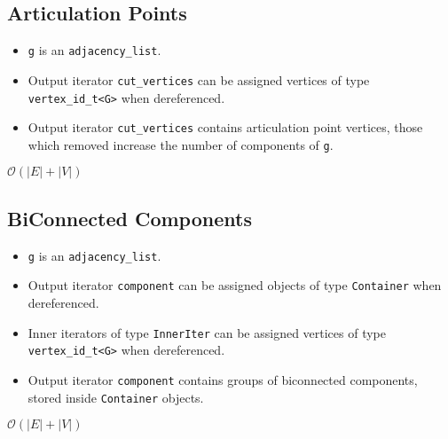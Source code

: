 \subsection{Articulation Points}
{\small
     
}
\begin{itemdescr}
      \pnum\preconditions
      \begin{itemize}
            \item
              \lstinline{g} is an \lstinline{adjacency_list}.
            \item
              Output iterator \lstinline{cut_vertices} can be assigned vertices of type \lstinline{vertex_id_t<G>} when dereferenced.
      \end{itemize}
      \pnum\effects
      \begin{itemize}
            \item
            Output iterator \lstinline{cut_vertices} contains articulation point vertices, those which removed increase the number of components of \lstinline{g}.
      \end{itemize}

      \pnum\complexity $\mathcal{O}(|E|+|V|)$
\end{itemdescr}

\subsection{BiConnected Components}
{\small
     
}
\begin{itemdescr}
      \pnum\preconditions
      \begin{itemize}
            \item
              \lstinline{g} is an \lstinline{adjacency_list}.
            \item
              Output iterator \lstinline{component} can be assigned objects of type \lstinline{Container} when dereferenced.
            \item
              Inner iterators of type \lstinline{InnerIter} can be assigned vertices of type \lstinline{vertex_id_t<G>} when dereferenced.
      \end{itemize}
      \pnum\effects
      \begin{itemize}
            \item
            Output iterator \lstinline{component} contains groups of biconnected components, stored inside \lstinline{Container} objects.
      \end{itemize}

      \pnum\complexity $\mathcal{O}(|E|+|V|)$
\end{itemdescr}

